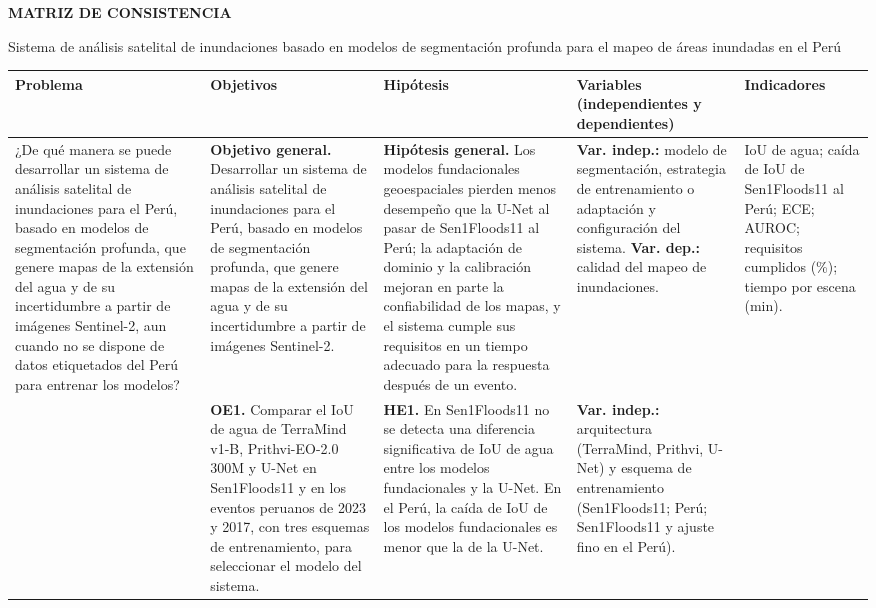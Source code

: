 \documentclass[10pt]{article}
\begin{document}
{\centering
{\large\textbf{MATRIZ DE CONSISTENCIA}}\par\smallskip
Sistema de análisis satelital de inundaciones basado en modelos de segmentación profunda para el
mapeo de áreas inundadas en el Perú\par}
\bigskip

{\footnotesize\setlength{\tabcolsep}{4pt}
\begin{tabular}{|L{3.6cm}|L{4.6cm}|L{5.2cm}|L{5.6cm}|L{5.6cm}|}
\hline
\textbf{Problema} & \textbf{Objetivos} & \textbf{Hipótesis} &
\textbf{Variables (independientes y dependientes)} & \textbf{Indicadores} \\ \hline
¿De qué manera se puede desarrollar un sistema de análisis satelital de inundaciones para el
Perú, basado en modelos de segmentación profunda, que genere mapas de la extensión del agua y de
su incertidumbre a partir de imágenes Sentinel-2, aun cuando no se dispone de datos etiquetados
del Perú para entrenar los modelos?
&
\textbf{Objetivo general.} Desarrollar un sistema de análisis satelital de inundaciones para el
Perú, basado en modelos de segmentación profunda, que genere mapas de la extensión del agua y de
su incertidumbre a partir de imágenes Sentinel-2.
&
\textbf{Hipótesis general.} Los modelos fundacionales geoespaciales pierden menos desempeño que la
U-Net al pasar de Sen1Floods11 al Perú; la adaptación de dominio y la calibración mejoran en parte
la confiabilidad de los mapas, y el sistema cumple sus requisitos en un tiempo adecuado para la
respuesta después de un evento.
&
\textbf{Var. indep.:} modelo de segmentación, estrategia de entrenamiento o adaptación y
configuración del sistema.\newline
\textbf{Var. dep.:} calidad del mapeo de inundaciones.
&
IoU de agua; caída de IoU de Sen1Floods11 al Perú; ECE; AUROC; requisitos cumplidos (\%);
tiempo por escena (min).
\\ 
&
\textbf{OE1.} Comparar el IoU de agua de TerraMind v1-B, Prithvi-EO-2.0 300M y U-Net en
Sen1Floods11 y en los eventos peruanos de 2023 y 2017, con tres esquemas de entrenamiento, para
seleccionar el modelo del sistema.
&
\textbf{HE1.} En Sen1Floods11 no se detecta una diferencia significativa de IoU de agua entre los
modelos fundacionales y la U-Net. En el Perú, la caída de IoU de los modelos fundacionales es
menor que la de la U-Net.
&
\textbf{Var. indep.:} arquitectura (TerraMind, Prithvi, U-Net) y esquema de entrenamiento
(Sen1Floods11; Perú; Sen1Floods11 y ajuste fino en el Perú).\newline

\end{tabular}}
\end{document}
